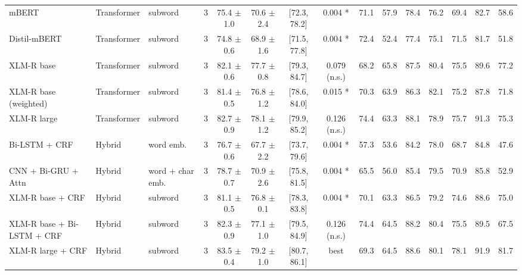 \begin{table}[t]
\begin{tabular}{lllcccccccccccc}
\hline
mBERT & Transformer & subword & 3 & 75.4 $\pm$ 1.0 & 70.6 $\pm$ 2.4 & [72.3, 78.2] & 0.004 * & 71.1 & 57.9 & 78.4 & 76.2 & 69.4 & 82.7 & 58.6 \\
Distil-mBERT & Transformer & subword & 3 & 74.8 $\pm$ 0.6 & 68.9 $\pm$ 1.6 & [71.5, 77.8] & 0.004 * & 72.4 & 52.4 & 77.4 & 75.1 & 71.5 & 81.7 & 51.8 \\
XLM-R base & Transformer & subword & 3 & 82.1 $\pm$ 0.6 & 77.7 $\pm$ 0.8 & [79.3, 84.7] & 0.079 (n.s.) & 68.2 & 65.8 & 87.5 & 80.4 & 75.5 & 89.6 & 77.2 \\
XLM-R base (weighted) & Transformer & subword & 3 & 81.4 $\pm$ 0.5 & 76.8 $\pm$ 1.2 & [78.6, 84.0] & 0.015 * & 70.3 & 63.9 & 86.3 & 82.1 & 75.2 & 87.8 & 71.8 \\
XLM-R large & Transformer & subword & 3 & 82.7 $\pm$ 0.9 & 78.1 $\pm$ 1.2 & [79.9, 85.2] & 0.126 (n.s.) & 74.4 & 63.3 & 88.1 & 78.9 & 75.7 & 91.3 & 75.3 \\
\hline
Bi-LSTM + CRF & Hybrid & word emb. & 3 & 76.7 $\pm$ 0.6 & 67.7 $\pm$ 2.2 & [73.7, 79.6] & 0.004 * & 57.3 & 53.6 & 84.2 & 78.0 & 68.7 & 84.8 & 47.6 \\
CNN + Bi-GRU + Attn & Hybrid & word + char emb. & 3 & 78.7 $\pm$ 0.7 & 70.9 $\pm$ 2.6 & [75.8, 81.5] & 0.004 * & 65.5 & 56.0 & 85.4 & 79.5 & 70.9 & 85.8 & 52.9 \\
XLM-R base + CRF & Hybrid & subword & 3 & 81.1 $\pm$ 0.5 & 76.8 $\pm$ 0.1 & [78.3, 83.8] & 0.004 * & 70.1 & 63.3 & 86.5 & 79.2 & 74.6 & 88.6 & 75.0 \\
XLM-R base + Bi-LSTM + CRF & Hybrid & subword & 3 & 82.3 $\pm$ 0.9 & 77.1 $\pm$ 1.0 & [79.5, 84.9] & 0.126 (n.s.) & 74.4 & 64.5 & 88.2 & 80.4 & 75.5 & 89.5 & 67.5 \\
XLM-R large + CRF & Hybrid & subword & 3 & 83.5 $\pm$ 0.4 & 79.2 $\pm$ 1.0 & [80.7, 86.1] & best & 69.3 & 64.5 & 88.6 & 80.1 & 78.1 & 91.9 & 81.7 \\
\hline
\end{tabular}
\end{table}